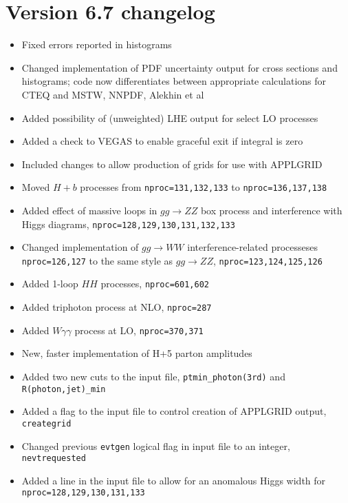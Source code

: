 \documentclass{article}
\begin{document}
{{{{{{\section{Version 6.7 changelog}
\label{changelog6.7}
\begin{itemize}
\item Fixed errors reported in histograms
\item Changed implementation of PDF uncertainty output for cross sections and histograms; code now differentiates
between appropriate calculations for CTEQ and MSTW, NNPDF, Alekhin et al
\item Added possibility of (unweighted) LHE output for select LO processes
\item Added a check to VEGAS to enable graceful exit if integral is zero
\item Included changes to allow production of grids for use with APPLGRID
\item Moved $H+b$ processes from {\tt nproc=131,132,133} to {\tt nproc=136,137,138}
\item Added effect of massive loops in $gg\to ZZ$ box process and interference with Higgs diagrams,
{\tt nproc=128,129,130,131,132,133}
\item Changed implementation of $gg \to WW$ interference-related processeses {\tt nproc=126,127} to
the same style as $gg\to ZZ$, {\tt nproc=123,124,125,126}
\item Added 1-loop $HH$ processes,  {\tt nproc=601,602}
\item Added triphoton process at NLO, {\tt nproc=287}
\item Added $W\gamma\gamma$ process at LO,  {\tt nproc=370,371}
\item New, faster implementation of H+5 parton amplitudes 
\item Added two new cuts to the input file, {\tt ptmin\_photon(3rd)} and {\tt R(photon,jet)\_min}
\item Added a flag to the input file to control creation of APPLGRID output, {\tt creategrid}
\item Changed previous {\tt evtgen} logical flag in input file to an integer, {\tt nevtrequested}
\item Added a line in the input file to allow for an anomalous Higgs width for {\tt nproc=128,129,130,131,133}
\end{itemize}

}}}}}}
\end{document}
